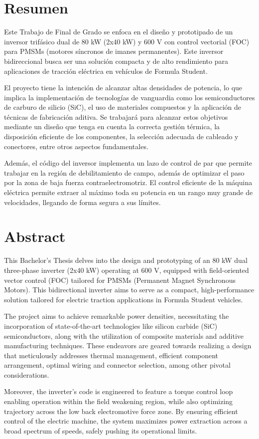 \chapter*{Resumen}
Este Trabajo de Final de Grado se enfoca en el diseño y prototipado de un inversor trifásico dual de 80 kW (2x40 kW) y 600 V con control vectorial (FOC) para PMSMs (motores síncronos de imanes permanentes). Este inversor bidireccional busca ser una solución compacta y de alto rendimiento para aplicaciones de tracción eléctrica en vehículos de Formula Student.

El proyecto tiene la intención de alcanzar altas densidades de potencia, lo que implica la implementación de tecnologías de vanguardia como los semiconductores de carburo de silicio (SiC), el uso de materiales compuestos y la aplicación de técnicas de fabricación aditiva. Se trabajará para alcanzar estos objetivos mediante un diseño que tenga en cuenta la correcta gestión térmica, la disposición eficiente de los componentes, la selección adecuada de cableado y conectores, entre otros aspectos fundamentales.

Además, el código del inversor implementa un lazo de control de par que permite trabajar en la región de debilitamiento de campo, además de optimizar el paso por la zona de baja fuerza contraelectromotriz. El control eficiente de la máquina eléctrica permite extraer al máximo toda su potencia en un rango muy grande de velocidades, llegando de forma segura a sus límites.

\chapter*{Abstract}
This Bachelor's Thesis delves into the design and prototyping of an 80 kW dual three-phase inverter (2x40 kW) operating at 600 V, equipped with field-oriented vector control (FOC) tailored for PMSMs (Permanent Magnet Synchronous Motors). This bidirectional inverter aims to serve as a compact, high-performance solution tailored for electric traction applications in Formula Student vehicles.

The project aims to achieve remarkable power densities, necessitating the incorporation of state-of-the-art technologies like silicon carbide (SiC) semiconductors, along with the utilization of composite materials and additive manufacturing techniques. These endeavors are geared towards realizing a design that meticulously addresses thermal management, efficient component arrangement, optimal wiring and connector selection, among other pivotal considerations.

Moreover, the inverter's code is engineered to feature a torque control loop enabling operation within the field weakening region, while also optimizing trajectory across the low back electromotive force zone. By ensuring efficient control of the electric machine, the system maximizes power extraction across a broad spectrum of speeds, safely pushing its operational limits.